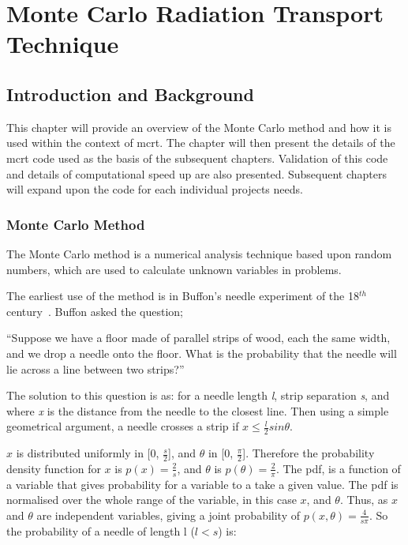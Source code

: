\chapter{Monte Carlo Radiation Transport Technique}
\label{sec:mcrt}
\section{Introduction and Background}
This chapter will provide an overview of the Monte Carlo method and how it is used within the context of \gls{mcrt}. The chapter will then present the details of the \gls{mcrt} code used as the basis of the subsequent chapters. Validation of this code and details of computational speed up are also presented. Subsequent chapters will expand upon the code for each individual projects needs.

\subsection{Monte Carlo Method}\label{sec:mcmethod}
The Monte Carlo method is a numerical analysis technique based upon random numbers, which are used to calculate unknown variables in problems. 

The earliest use of the method is in Buffon's needle experiment of the 18$^{th}$ century~\cite{badger1994lazzarini,beckmann2015history,buffon1785histoire}. Buffon asked the question;

\medskip

``Suppose we have a floor made of parallel strips of wood, each the same width, and we drop a needle onto the floor. What is the probability that the needle will lie across a line between two strips?''

\medskip

The solution to this question is as:
for a needle length \textit{l}, strip separation \textit{s}, and where \textit{x} is the distance from the needle to the closest line. Then using a simple geometrical argument, a needle crosses a strip if $x \leq \tfrac{l}{2} sin \theta$.

$x$ is distributed uniformly in [0, $\tfrac{s}{2}$], and $\theta$ in [0, $\tfrac{\pi}{2}$]. Therefore the probability density function for $x$ is $p(x)=\tfrac{2}{s}$, and $\theta$ is $p(\theta) = \tfrac{2}{\pi}$. The \gls{pdf}, is a function of a variable that gives probability for a variable to a take a given value. The \gls{pdf} is normalised over the whole range of the variable, in this case $x$, and $\theta$.
Thus, as $x$ and $\theta$ are independent variables, giving a joint probability of $p(x,\theta) = \tfrac{4}{s \pi}$.
So the probability of a needle of length l ($l<s$) is:

